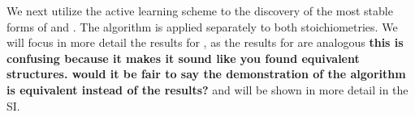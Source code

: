 %



%
We next utilize the active learning scheme to the discovery of the most stable forms of \IrOtwo and \IrOthree.
%
The algorithm is applied separately to both stoichiometries.
%
We will focus in more detail the results for \IrOthree, as the results for \IrOtwo are analogous \textbf{this is confusing because it makes it sound like you found equivalent structures.  would it be fair to say the demonstration of the algorithm is equivalent instead of the results?} and will be shown in more detail in the SI.


